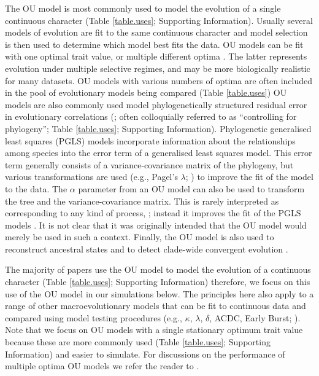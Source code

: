 \documentclass[a4paper,12pt]{article}
\begin{document}
  The OU model is most commonly used to model the evolution of a single continuous character (Table \ref{table.uses}; Supporting Information). 
  Usually several models of evolution \citep[e.g., Brownian motion, OU, Early burst etc.;][]{Harmon:2010aa,cooper2010body,cardillo2015geographic,slater2015iterative} are fit to the same continuous character and model selection is then used to determine which model best fits the data.  
  OU models can be fit with one optimal trait value, or multiple different optima \citep{Butler:2004aa,beaulieu2012modeling}. 
  The latter represents evolution under multiple selective regimes, and may be more biologically realistic for many datasets. 
  OU models with various numbers of optima are often included in the pool of evolutionary models being compared \citep[e.g.,][]{christin2013anatomical}(Table \ref{table.uses})
  OU models are also commonly used model phylogenetically structured residual error in evolutionary correlations (\citealp{revell2010phylogenetic}; often colloquially referred to as ``controlling for phylogeny''; Table \ref{table.uses}; Supporting Information).  
  Phylogenetic generalised least squares (PGLS) models incorporate information about the relationships among species into the error term of a generalised least squares model. 
  This error term generally consists of a variance-covariance matrix of the phylogeny, but various transformations are used (e.g., Pagel's $\lambda$; \citealp{Pagel:1997aa}) to improve the fit of the model to the data. 
  The $\alpha$ parameter from an OU model can also be used to transform the tree and the variance-covariance matrix.
  This is rarely interpreted as corresponding to any kind of process,
  ; instead it improves the fit of the PGLS models \citep[e.g.,][]{blankers2012ecological}. 
  It is not clear that it was originally intended that the OU model would merely be used in such a context.
  Finally, the OU model is also used to reconstruct ancestral states \citep{martins1999estimation} and to detect clade-wide convergent evolution \citep{ingram2013surface,uyeda2014novel}. 

  The majority of papers use the OU model to model the evolution of a continuous character (Table \ref{table.uses}; Supporting Information) therefore, we focus on this use of the OU model in our simulations below. 
  The principles here also apply to a range of other macroevolutionary models that can be fit to continuous data and compared using model testing procedures (e.g., $\kappa$, $\lambda$, $\delta$, ACDC, Early Burst; \citealp{Pagel:1997aa,Pagel:1999aa,Blomberg:2003aa,Harmon:2008aa}).
  Note that we focus on OU models with a single stationary optimum trait value because these are more commonly used (Table \ref{table.uses}; Supporting Information) and easier to simulate.  For discussions on the performance of multiple optima OU models we refer the reader to \citet{beaulieu2012ouwie}.
\end{document}
